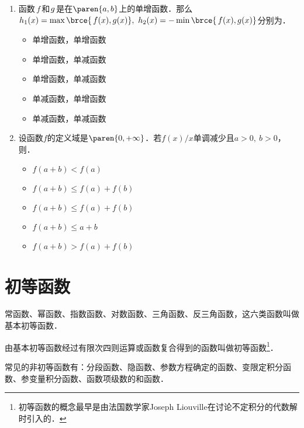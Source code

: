 \begin{enumerate}
\item 函数\(\,f\,\)和\(\mkern2mu g\mkern1mu\)是在\(\paren{a,b}\)上的单增函数．那么\(h_1(x) = \max\brce{\,f(x), g(x)},\ h_2(x) = -\min\brce{\,f(x), g(x)}\)分别为\uline{\makebox[6em]{}}．
  \begin{itemize}
    \renewcommand{\labelitemi}{\faCircleThin}
  \item 单增函数，单增函数
    \ifshowsol
  \item[\faCircle] 单增函数，单减函数
    \else
  \item 单增函数，单减函数
    \fi
  \item 单减函数，单增函数
  \item 单减函数，单减函数
  \end{itemize}

\item 设函数\(f\)的定义域是\(\paren{0,+\infty}\)．若\(f(x)/x\)单调减少且\(a > 0,\ b > 0\)，则\uline{\makebox[6em]{}}．
  \begin{itemize}
    \renewcommand{\labelitemi}{\faCircleThin}
  \item \(f(a+b) < f(a)\)
    \ifshowsol
  \item[\faCircle] \(f(a+b) \le f(a) + f(b)\)
    \else
  \item \(f(a+b) \le f(a) + f(b)\)
    \fi
  \item \(f(a+b) \le a + b\)
  \item \(f(a+b) > f(a) + f(b)\)
  \end{itemize}
\end{enumerate}
\fi

\section{初等函数}

\begin{definition*}
  常函数、幂函数、指数函数、对数函数、三角函数、反三角函数，这六类函数叫做基本初等函数．
\end{definition*}

\begin{definition*}
  由基本初等函数经过有限次四则运算或函数复合得到的函数叫做初等函数\footnote{初等函数的概念最早是由法国数学家Joseph Liouville在讨论不定积分的代数解时引入的．}．
\end{definition*}

\begin{remark}
  常见的非初等函数有：分段函数、隐函数、参数方程确定的函数、变限定积分函数、参变量积分函数、函数项级数的和函数．
\end{remark}

